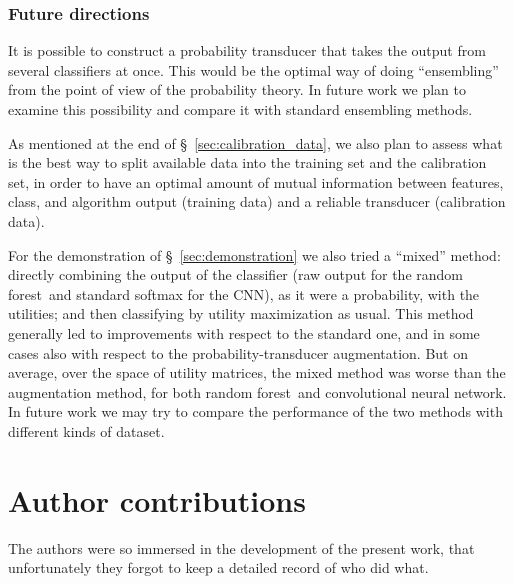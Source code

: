 \documentclass[\ifafour a4paper,12pt,\else a5paper,10pt,\fi%
onecolumn,oneside,article,%
british%
]{memoir}
\theoremstyle{remark}
\theoremstyle{innote}
\newenvironment{contributions}{\section*{Author contributions}\addcontentsline{toc}{section}{Author contributions}}{\par}
\newcommand*{\wrench}{{\fontencoding{U}\fontfamily{fontawesomethree}\selectfont\symbol{114}}}
\newcommand{\mynotew}[1]{{\footnotesize\color{notecolour}\wrench\ #1}}
\renewcommand*{\|}[1][]{\nonscript\:#1\vert\nonscript\:\mathopen{}}
\newcommand*{\sect}{\S}%
\newcommand*{\RF}{random forest}
\newcommand*{\CNN}{convolutional neural network}
\begin{document}
\subsubsection{Future directions}
\label{sec:future}

It is possible to construct a probability transducer that takes the output from several classifiers at once. This would be the optimal way of doing \enquote{ensembling} from the point of view of the probability theory. In future work we plan to examine this possibility and compare it with standard ensembling methods.

As mentioned at the end of  \sect~\ref{sec:calibration_data}, we also plan to assess what is the best way to split available data into the training set and the calibration set, in order to have an optimal amount of mutual information between features, class, and algorithm output (training data) and a reliable transducer (calibration data).


For the demonstration of \sect~\ref{sec:demonstration} we also tried a \enquote{mixed} method: directly combining the output of the classifier (raw output for the \RF\ and standard softmax for the CNN), as it were a probability, with the utilities; and then classifying by utility maximization as usual. This method generally led to improvements with respect to the standard one, and in some cases also with respect to the probability-transducer augmentation. But on average, over the space of utility matrices, the mixed method was worse than the augmentation method, for both \RF\ and \CNN. In future work we may try to compare the performance of the two methods with different kinds of dataset.










\bigskip

\begin{contributions}
The authors were so immersed in the development of the present work, that unfortunately they forgot to keep a detailed record of who did what.
\end{contributions}
\end{document}
